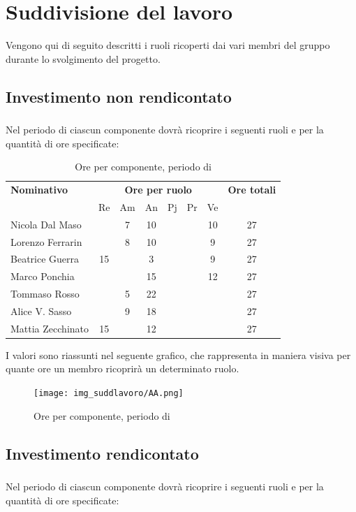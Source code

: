 \section{Suddivisione del lavoro}
Vengono qui di seguito descritti i ruoli ricoperti dai vari membri del gruppo durante lo svolgimento del progetto.
\subsection{Investimento non rendicontato}
\subsubsection{\AR}
Nel periodo di \AR{} ciascun componente dovrà ricoprire i seguenti ruoli e per la quantità di ore specificate:

\begin{table}[H]
	\centering
	\begin{tabular}{|l|c|c|c|c|c|c|c|}
		\hline
		\textbf{Nominativo} & 
		\multicolumn{6}{c|}{\textbf{Ore per ruolo}} & 
		\textbf{Ore totali} \\
		& Re & Am & An & Pj & Pr & Ve & \\
		\hline
		Nicola Dal Maso & & 7 & 10 & & & 10 & 27 \\
		Lorenzo Ferrarin & & 8 & 10 & & & 9 & 27 \\
		Beatrice Guerra & 15 & & 3 & & & 9 & 27 \\
		Marco Ponchia & & & 15 & & & 12 & 27 \\
		Tommaso Rosso & & 5 & 22 & & & & 27 \\
		Alice V. Sasso & & 9 & 18 & & & & 27 \\
		Mattia Zecchinato & 15 & & 12 & & & & 27 \\
		\hline
	\end{tabular}
	\caption{Ore per componente, periodo di \AR{}}
\end{table}
I valori sono riassunti nel seguente grafico, che rappresenta in maniera visiva per quante ore un membro ricoprirà un determinato ruolo.
\begin{figure}[H]
	\centering
	\texttt{[image: img\_suddlavoro/AA.png]}
	\caption{Ore per componente, periodo di \AR{}}
\end{figure}

\subsection{Investimento rendicontato}
\subsubsection{\AD}
Nel periodo di \AD{} ciascun componente dovrà ricoprire i seguenti ruoli e per la quantità di ore specificate:

